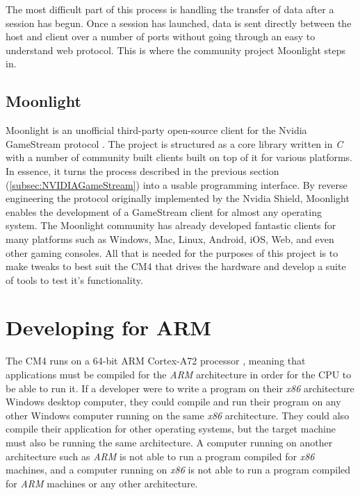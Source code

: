 The most difficult part of this process is handling the transfer of data after a session has begun.
Once a session has launched, data is sent directly between the host and client over a number of ports without going through an easy to understand web protocol.
This is where the community project Moonlight steps in.

\subsection{Moonlight}\label{subsec:Moonlight}

Moonlight is an unofficial third-party open-source client for the Nvidia GameStream protocol \cite{moonlight}.
The project is structured as a core library written in \emph{C} with a number of community built clients built on top of it for various platforms.
In essence, it turns the process described in the previous section (\ref{subsec:NVIDIAGameStream}) into a usable programming interface.
By reverse engineering the protocol originally implemented by the Nvidia Shield, Moonlight enables the development of a GameStream client for almost any operating system.
The Moonlight community has already developed fantastic clients for many platforms such as Windows, Mac, Linux, Android, iOS, Web, and even other gaming consoles.
All that is needed for the purposes of this project is to make tweaks to best suit the CM4 that drives the hardware and develop a suite of tools to test it's functionality.


\section{Developing for ARM}\label{sec:DevelopingForARM}

The CM4 runs on a 64-bit ARM Cortex-A72 processor \cite{rpi_cm4}, meaning that applications must be compiled for the \emph{ARM} architecture in order for the CPU to be able to run it.
If a developer were to write a program on their \emph{x86} architecture Windows desktop computer, they could compile and run their program on any other Windows computer running on the same \emph{x86} architecture.
They could also compile their application for other operating systems, but the target machine must also be running the same architecture.
A computer running on another architecture such as \emph{ARM} is not able to run a program compiled for \emph{x86} machines, and a computer running on \emph{x86} is not able to run a program compiled for \emph{ARM} machines or any other architecture.

